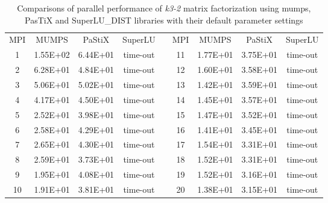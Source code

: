 \begin{table}[ht]
\centering
\begin{tabular}{|c|c|c|c|l|c|c|c|c|}
\cline{1-4} \cline{6-9}
MPI & MUMPS    & PaStiX   & SuperLU &  & MPI & MUMPS    & PaStiX   & SuperLU \\ \cline{1-4} \cline{6-9} 
1   & 1.55E+02 & 6.44E+01 & time-out &  & 11  & 1.77E+01 & 3.75E+01 & time-out \\ \cline{1-4} \cline{6-9} 
2   & 6.28E+01 & 4.84E+01 & time-out &  & 12  & 1.60E+01 & 3.58E+01 & time-out \\ \cline{1-4} \cline{6-9} 
3   & 5.06E+01 & 5.02E+01 & time-out &  & 13  & 1.42E+01 & 3.59E+01 & time-out \\ \cline{1-4} \cline{6-9} 
4   & 4.17E+01 & 4.50E+01 & time-out &  & 14  & 1.45E+01 & 3.57E+01 & time-out \\ \cline{1-4} \cline{6-9} 
5   & 2.52E+01 & 3.98E+01 & time-out &  & 15  & 1.47E+01 & 3.52E+01 & time-out \\ \cline{1-4} \cline{6-9} 
6   & 2.58E+01 & 4.29E+01 & time-out &  & 16  & 1.41E+01 & 3.45E+01 & time-out \\ \cline{1-4} \cline{6-9} 
7   & 2.65E+01 & 4.30E+01 & time-out &  & 17  & 1.54E+01 & 3.31E+01 & time-out \\ \cline{1-4} \cline{6-9} 
8   & 2.59E+01 & 3.73E+01 & time-out &  & 18  & 1.52E+01 & 3.31E+01 & time-out \\ \cline{1-4} \cline{6-9} 
9   & 1.95E+01 & 4.08E+01 & time-out &  & 19  & 1.52E+01 & 3.16E+01 & time-out \\ \cline{1-4} \cline{6-9} 
10  & 1.91E+01 & 3.81E+01 & time-out &  & 20  & 1.38E+01 & 3.15E+01 & time-out \\ \cline{1-4} \cline{6-9} 
\end{tabular}
\caption{Comparisons of parallel performance of  \textit{k3-2} matrix factorization using \acrshort{mumps}, PasTiX and SuperLU\_DIST libraries with their default parameter settings}
\label{table:app-lc-k3-2-result}
\end{table}



